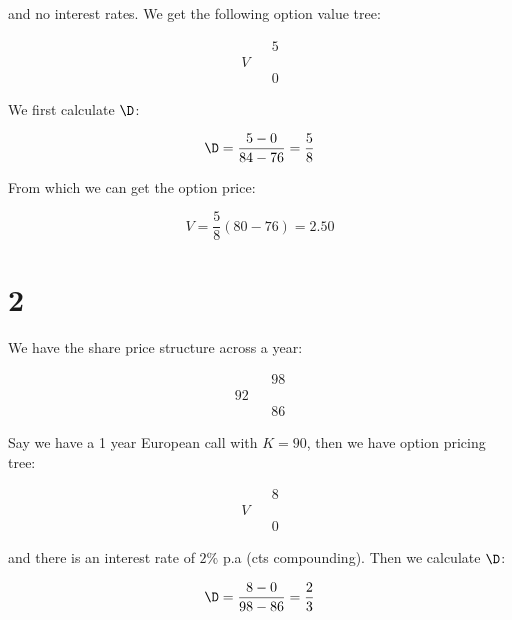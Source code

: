 \documentclass{article}
\begin{document}
	and no interest rates. We get the following option value tree:
	
	\begin{equation*}
		\begin{array}{ccc}
			  &   & 5 \\
			V &   & \\
		   	  &   & 0
		\end{array}
	\end{equation*}
	
	We first calculate $\D$:
	
	\begin{equation*}
		\D = \frac{5 - 0}{84 - 76} = \frac{5}{8}
	\end{equation*}
	
	From which we can get the option price:
	
	\begin{equation*}
		V = \frac{5}{8}(80 - 76) = 2.50
	\end{equation*}
	
	\section*{2}
	
	We have the share price structure across a year:
	
	\begin{equation*}
		\begin{array}{ccc}
			   &   & 98 \\
			92 &   & \\
			   &   & 86
		\end{array}
	\end{equation*}
	
	Say we have a 1 year European call with $K=90$, then we have option pricing tree:
	
	\begin{equation*}
		\begin{array}{ccc}
			   &   & 8 \\
			V  &   & \\
			   &   & 0
		\end{array}
	\end{equation*} 
	
	and there is an interest rate of $2\%$ p.a (cts compounding). Then we calculate $\D$:
	
	\begin{equation*}
		\D = \frac{8 - 0}{98 - 86} = \frac{2}{3}
	\end{equation*}
	
\end{document}
